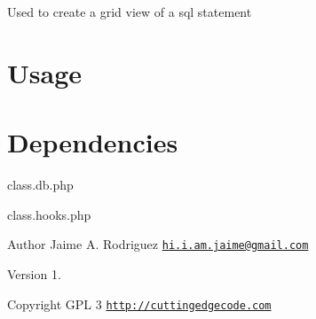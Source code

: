 Used to create a grid view of a sql statement\hypertarget{template1_usage}{}\section{Usage}\label{template1_usage}

\hypertarget{record1_dependencies}{}\section{Dependencies}\label{record1_dependencies}

\begin{DoxyItemize}
\item class.\-db.\-php
\item class.\-hooks.\-php
\end{DoxyItemize}

\begin{DoxyAuthor}{Author}
Jaime A. Rodriguez \href{mailto:hi.i.am.jaime@gmail.com}{\tt hi.\-i.\-am.\-jaime@gmail.\-com} 
\end{DoxyAuthor}
\begin{DoxyVersion}{Version}
1. 
\end{DoxyVersion}
\begin{DoxyCopyright}{Copyright}
G\-P\-L 3 \href{http://cuttingedgecode.com}{\tt http\-://cuttingedgecode.\-com} 
\end{DoxyCopyright}
